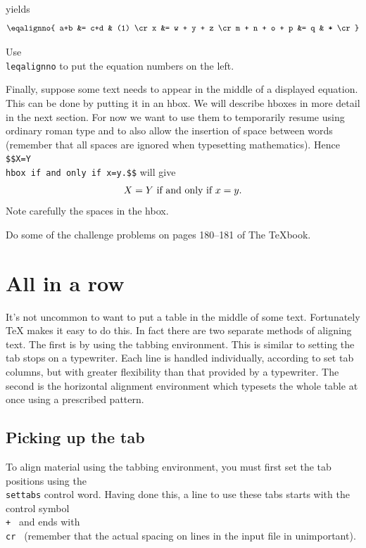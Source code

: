 \noindent 
yields 
$$\eqalignno{ 
a+b &= c+d & (1) \cr 
x &= w + y + z \cr 
m + n + o + p &= q & * \cr 
}$$ 

Use {\tt \\leqalignno} to put the equation numbers on the left. 

Finally, suppose some text needs to appear in the middle of a 
displayed equation.  This can be done by putting it in an hbox. 
We will describe hboxes in more detail in the next section. 
For now we want to use them to temporarily resume using ordinary 
roman type and to also allow the insertion of space between 
words (remember that all spaces are ignored when typesetting 
mathematics). Hence 
{\tt \$\$X=Y \\hbox\lb{} if and only if \rb x=y.\$\$} will give 
$$X=Y \hbox{ if and only if } x=y.$$ 
Note carefully the spaces in the hbox. 

\exercise Do some of the challenge problems on pages 180--181 of The 
\TeX book. 




\section{All in a row} 

It's not uncommon to want to put a table in the middle of some 
text. Fortunately \TeX{} makes it easy to do this.  In fact there 
are two separate methods of aligning text.  The first is by using 
the tabbing environment.  This is similar to setting the tab 
stops on a typewriter. Each line is handled individually, 
according to set tab columns, but with greater flexibility than 
that provided by a typewriter. The second is the horizontal 
alignment environment which typesets the whole table at once 
using a prescribed pattern. 

\subsection{Picking up the tab} 

To align material using the tabbing environment, you must first 
set the tab positions using the {\tt \\settabs} control word. 
Having done this, a line to use these tabs starts with the 
control symbol {\tt \\+ } and ends with {\tt \\cr } (remember 
that the actual spacing on lines in the input file in 
unimportant).  

